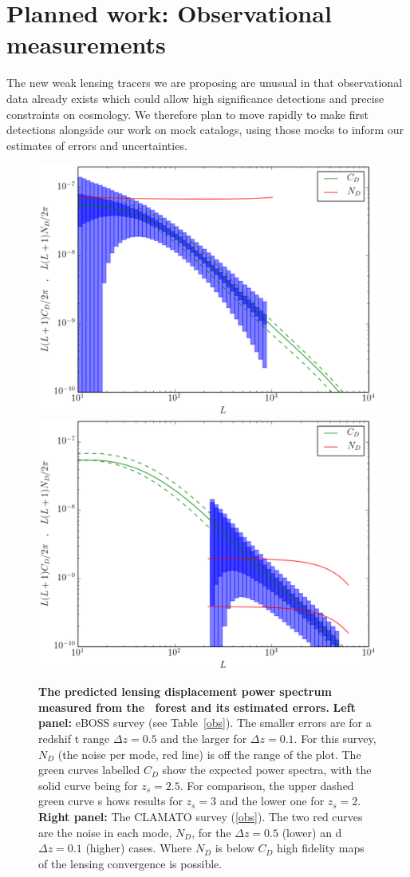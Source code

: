 \section{Planned work: Observational measurements}

The new weak lensing tracers we are proposing are unusual in that
observational data already exists which could allow high
significance detections and precise constraints on cosmology. We
therefore plan to move rapidly  to make first detections alongside
our work on mock catalogs,  using those mocks to
inform our estimates of errors and uncertainties.



\begin{figure}
 \includegraphics[width=0.5\columnwidth]{figs/eBOSS.eps}
 \includegraphics[width=0.5\columnwidth]{figs/CLAMATO.eps}
 \caption{ \footnotesize {\bf The predicted lensing displacement power spectrum  measured
from the \lya\ forest and its 
estimated errors. }
{\bf Left panel:}
eBOSS survey  (see Table~\ref{obs}). The smaller errors are for a redshif
t range $\Delta z =0.5$ and the larger for $\Delta z = 0.1$.  For this survey,  $N_D$ (the noise per 
mode, red line)  is off the range of the plot.  The green curves labelled $C_D$ show the expected power spectra, with the solid curve being for $z_s=2.5$.  For comparison, the upper dashed green curve s
hows results for $z_s=3$ and the lower one for $z_s=2$. {\bf Right panel:}
The CLAMATO survey (\ref{obs}).
The two red curves are the noise in each mode, $N_D$, for the $\Delta z =0.5$ (lower) an
d $\Delta z = 0.1$ (higher) cases.  Where $N_D$ is below $C_D$ high fidelity maps of the lensing convergence is possible.}

 \label{pkpred}
\end{figure}



